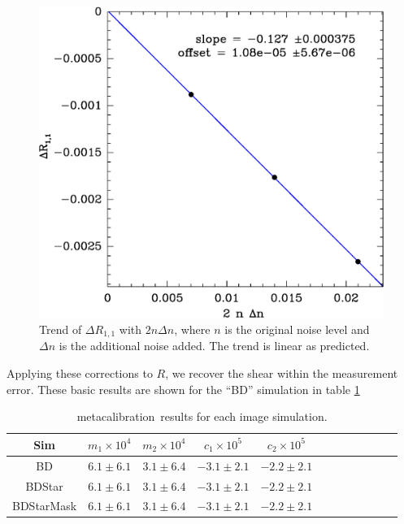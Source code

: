 \documentclass[usegraphicx,usenatbib]{mn2e}
\newcommand{\mcal}{metacalibration}
\begin{document}
\begin{figure}
    \includegraphics[scale=0.45]{run-bd13mcal-dt02-Rnoise-detrend-R11.eps}

    \caption{Trend of $\Delta R_{1,1}$ with $2 n \Delta n$, where $n$ is the
    original noise level and $\Delta n$ is the additional noise added.  The
trend is linear  as predicted.}

\label{fig:detrend}
\end{figure}

Applying these corrections to $R$, we recover the shear within the
measurement error. These basic results are shown for the ``BD'' simulation
in table \ref{tab:results}

\begin{table}
    \centering
    \caption{\mcal\ results for each image simulation. \label{tab:results}}
    \begin{tabular}{ | c | c | c | c | c | c | c | c | c | c | c | c |}
        Sim & $m_1 \times 10^4$ & $m_2 \times 10^4 $ & $c_1 \times 10^5$ & $c_2 \times 10^5$ \\
        \hline
        BD          & $6.1 \pm 6.1$ & $3.1 \pm 6.4$ & $-3.1 \pm 2.1$ & $-2.2 \pm 2.1$   \\
        BDStar      & $6.1 \pm 6.1$ & $3.1 \pm 6.4$ & $-3.1 \pm 2.1$ & $-2.2 \pm 2.1$   \\
        BDStarMask  & $6.1 \pm 6.1$ & $3.1 \pm 6.4$ & $-3.1 \pm 2.1$ & $-2.2 \pm 2.1$   \\
    \end{tabular}
\end{table}
\end{document}
